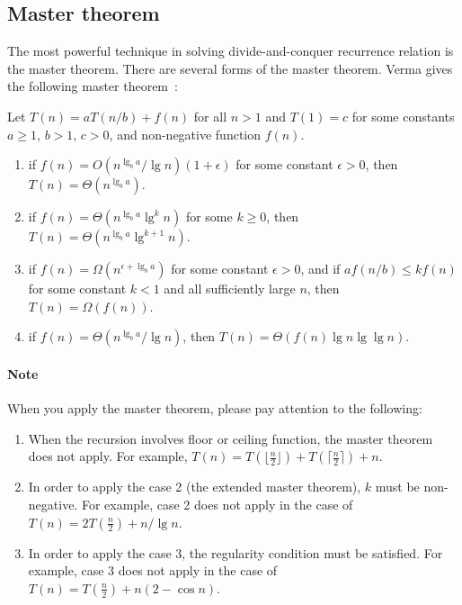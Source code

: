 \subsection{Master theorem}
The most powerful technique in solving divide-and-conquer recurrence relation is the master theorem.
There are several forms of the master theorem. Verma gives the following master theorem~\cite{Verma1994}:
\begin{theorem}
Let $T(n) = aT(n / b) + f(n)$ for all $n > 1$ and $T(1) = c$ for some constants $a \geq 1$, $b > 1$, $c > 0$, and non-negative function $f(n)$.
\begin{enumerate}
\item if $f(n) = O(n^{\lg_b a} / \lg n)(1 + \epsilon)$ for some constant $\epsilon > 0$, then $T(n) = \Theta(n^{\lg_b a})$.
\item if $f(n) = \Theta(n^{\lg_b a} \lg^k n)$ for some $k \geq 0$, then $T(n) = \Theta(n^{\lg_b a} \lg^{k+1} n)$.
\item if $f(n) = \Omega(n^{\epsilon + \lg_b a})$ for some constant $\epsilon > 0$, and if $af(n/b) \leq kf(n)$ for some constant $k < 1$ and all sufficiently large $n$, then $T(n) = \Omega(f(n))$.
\item if $f(n) = \Theta(n^{\lg_b a} / \lg n)$, then $T(n) = \Theta(f(n) \lg n \lg \lg n)$.
\end{enumerate}
\end{theorem}

\paragraph{Note} When you apply the master theorem, please pay attention to the following:
\begin{enumerate}
\item When the recursion involves floor or ceiling function, the master theorem does not apply. For example, $T(n) = T(\lfloor \frac{n}{2} \rfloor) + T(\lceil \frac{n}{2} \rceil) + n$. 
\item In order to apply the case 2 (the extended master theorem), $k$ must be non-negative. For example, case 2 does not apply in the case of $T(n) = 2T(\frac{n}{2}) + n/ \lg n$.
\item In order to apply the case 3, the regularity condition must be satisfied. For example, case 3 does not apply in the case of $T(n) = T(\frac{n}{2}) + n(2 - \cos n)$.
\end{enumerate}


